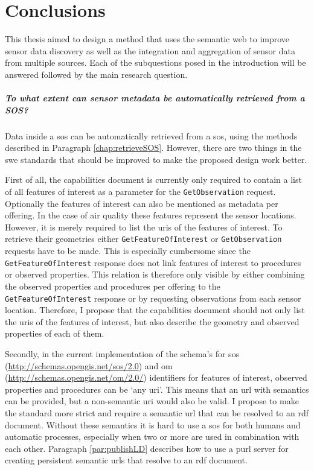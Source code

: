 
\chapter{Conclusions}
\label{chap:conclusion}

This thesis aimed to design a method that uses the semantic web to improve sensor data discovery as well as the integration and aggregation of sensor data from multiple sources. Each of the subquestions posed in the introduction will be answered followed by the main research question.

\paragraph{To what extent can sensor metadata be automatically retrieved from a SOS?}\mbox{}

Data inside a \acl{sos} can be automatically retrieved from a \ac{sos}, using the methods described in Paragraph \ref{chap:retrieveSOS}. However, there are two things in the \ac{swe} standards that should be improved to make the proposed design work better. 

First of all, the capabilities document is currently only required to contain a list of all features of interest as a parameter for the \texttt{GetObservation} request. Optionally the features of interest can also be mentioned as metadata per offering. In the case of air quality these features represent the sensor locations. However, it is merely required to list the \acp{uri} of the features of interest. To retrieve their geometries either \texttt{GetFeatureOfInterest} or \texttt{GetObservation} requests have to be made. This is especially cumbersome since the \texttt{GetFeatureOfInterest} response does not link features of interest to procedures or observed properties. This relation is therefore only visible by either combining the observed properties and procedures per offering to the \texttt{GetFeatureOfInterest} response or by requesting observations from each sensor location. Therefore, I propose that the capabilities document should not only list the \acp{uri} of the features of interest, but also describe the geometry and observed properties of each of them. 

Secondly, in the current implementation of the schema's for \ac{sos} (\url{http://schemas.opengis.net/sos/2.0}) and \ac{om} (\url{http://schemas.opengis.net/om/2.0/}) identifiers for features of interest, observed properties and procedures can be `any \ac{uri}'. This means that an \ac{url} with semantics can be provided, but a non-semantic \ac{uri} would also be valid. I propose to make the standard more strict and require a semantic \ac{url} that can be resolved to an \ac{rdf} document. Without these semantics it is hard to use a \ac{sos} for both humans and automatic processes, especially when two or more are used in combination with each other. Paragraph \ref{par:publishLD} describes how to use a \ac{purl} server for creating persistent semantic \acp{url} that resolve to an \ac{rdf} document. 

